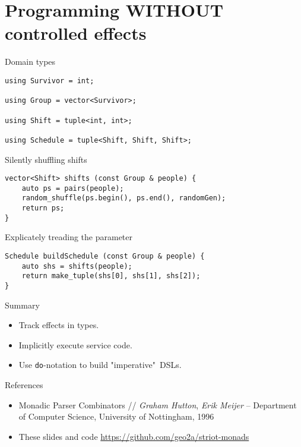 \section{Programming WITHOUT controlled effects}

\begin{frame}[fragile]{Domain types}
  \begin{block}{}
  \begin{verbatim}
using Survivor = int;

using Group = vector<Survivor>;

using Shift = tuple<int, int>;

using Schedule = tuple<Shift, Shift, Shift>;
  \end{verbatim}
  \end{block}
\end{frame}

\begin{frame}[fragile]{Silently shuffling shifts}
  \begin{block}{}
  \begin{verbatim}
vector<Shift> shifts (const Group & people) {
    auto ps = pairs(people);
    random_shuffle(ps.begin(), ps.end(), randomGen);
    return ps;
}
  \end{verbatim}
  \end{block}
\end{frame}

\begin{frame}[fragile]{Explicately treading the parameter}
  \begin{block}{}
  \begin{verbatim}
Schedule buildSchedule (const Group & people) {
    auto shs = shifts(people);
    return make_tuple(shs[0], shs[1], shs[2]);
}
  \end{verbatim}
  \end{block}
\end{frame}

\begin{frame}[fragile]{Summary}
  \begin{itemize}
    \item Track effects in types.
    \item Implicitly execute service code.
    \item Use \texttt{do}-notation to build "imperative"~DSLs.
  \end{itemize}
\end{frame}

\begin{frame}{References}

\begin{itemize}
  \item Monadic Parser Combinators // \textit{Graham Hutton}, \textit{Erik Meijer} – Department of Computer Science, University of Nottingham, 1996
  \item These slides and code \url{https://github.com/geo2a/striot-monads}
\end{itemize}

\end{frame}


